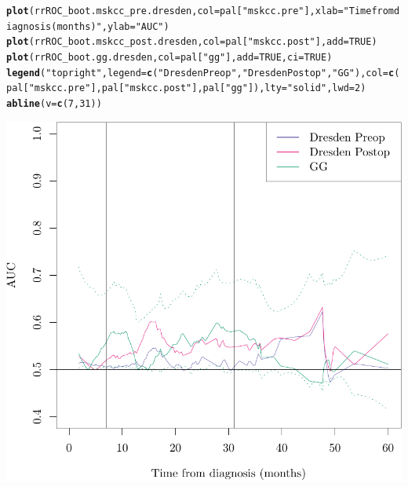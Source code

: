 \documentclass{article}\usepackage[]{graphicx}\usepackage[]{color}
\makeatletter
\def\maxwidth{ %
  \ifdim\Gin@nat@width>\linewidth
    \linewidth
  \else
    \Gin@nat@width
  \fi
}
\newcommand{\hlnum}[1]{\textcolor[rgb]{0.686,0.059,0.569}{#1}}%
\newcommand{\hlstr}[1]{\textcolor[rgb]{0.192,0.494,0.8}{#1}}%
\newcommand{\hlstd}[1]{\textcolor[rgb]{0.345,0.345,0.345}{#1}}%
\newcommand{\hlkwc}[1]{\textcolor[rgb]{0.333,0.667,0.333}{#1}}%
\newcommand{\hlkwd}[1]{\textcolor[rgb]{0.737,0.353,0.396}{\textbf{#1}}}%
\newenvironment{kframe}{%
 \def\at@end@of@kframe{}%
 \ifinner\ifhmode%
  \def\at@end@of@kframe{\end{minipage}}%
  \begin{minipage}{\columnwidth}%
 \fi\fi%
 \def\FrameCommand##1{\hskip\@totalleftmargin \hskip-\fboxsep
 \colorbox{shadecolor}{##1}\hskip-\fboxsep
     \hskip-\linewidth \hskip-\@totalleftmargin \hskip\columnwidth}%
 \MakeFramed {\advance\hsize-\width
   \@totalleftmargin\z@ \linewidth\hsize
   \@setminipage}}%
 {\par\unskip\endMakeFramed%
 \at@end@of@kframe}
\newenvironment{knitrout}{}{} %
\makeatother
\begin{document}
\begin{knitrout}
{}


\begin{kframe}\begin{alltt}
\hlkwd{plot}\hlstd{(rrROC_boot.mskcc_pre.dresden,} \hlkwc{col} \hlstd{= pal[}\hlstr{"mskcc.pre"}\hlstd{],} \hlkwc{xlab} \hlstd{=} \hlstr{"Time from diagnosis (months)"}\hlstd{,} \hlkwc{ylab} \hlstd{=} \hlstr{"AUC"}\hlstd{)}
\hlkwd{plot}\hlstd{(rrROC_boot.mskcc_post.dresden,} \hlkwc{col} \hlstd{= pal[}\hlstr{"mskcc.post"}\hlstd{],} \hlkwc{add} \hlstd{=} \hlnum{TRUE}\hlstd{)}
\hlkwd{plot}\hlstd{(rrROC_boot.gg.dresden,} \hlkwc{col} \hlstd{= pal[}\hlstr{"gg"}\hlstd{],} \hlkwc{add} \hlstd{=} \hlnum{TRUE}\hlstd{,} \hlkwc{ci} \hlstd{=} \hlnum{TRUE}\hlstd{)}
\hlkwd{legend}\hlstd{(}\hlstr{"topright"}\hlstd{,} \hlkwc{legend} \hlstd{=} \hlkwd{c}\hlstd{(}\hlstr{"Dresden Preop"}\hlstd{,} \hlstr{"Dresden Postop"}\hlstd{,} \hlstr{"GG"}\hlstd{),} \hlkwc{col} \hlstd{=} \hlkwd{c}\hlstd{(pal[}\hlstr{"mskcc.pre"}\hlstd{], pal[}\hlstr{"mskcc.post"}\hlstd{], pal[}\hlstr{"gg"}\hlstd{]),} \hlkwc{lty} \hlstd{=} \hlstr{"solid"}\hlstd{,} \hlkwc{lwd} \hlstd{=} \hlnum{2}\hlstd{)}
\hlkwd{abline}\hlstd{(}\hlkwc{v} \hlstd{=} \hlkwd{c}\hlstd{(}\hlnum{7}\hlstd{,} \hlnum{31}\hlstd{))}
\end{alltt}
\end{kframe}

{\centering \includegraphics[width=\maxwidth]{figure/07-risksetROC-plot-dresden-2} 

}



\end{knitrout}
\end{document}
